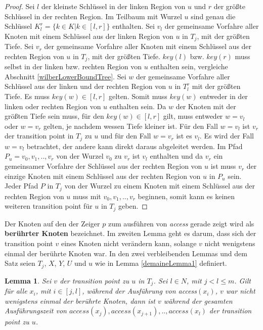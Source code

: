 \documentclass[a4paper,12pt]{article}
\newtheorem{Lemma}{Lemma}[section]
\begin{document}
\begin{proof}
	Sei $l$ der kleinste Schlüssel in der linken Region von $u$ und $r$ der größte Schlüssel in der rechten Region. Im Teilbaum mit Wurzel $u$ sind genau die Schlüssel $K^r_l = \{k \in K \vert k \in \left[l,r\right]\}$ enthalten. Sei $v_l$ der gemeinsame Vorfahre aller Knoten mit einem Schlüssel aus der linken Region von $u$ in $T_j$, mit der größten Tiefe. Sei $v_r$ der gemeinsame Vorfahre aller Knoten mit einem Schlüssel aus der rechten Region von $u$ in $T_j$, mit der größten Tiefe. $\mathit{key\left(l\right)}$ bzw. $\mathit{key\left(r\right)}$ muss selbst in der linken bzw. rechten Region von $u$ enthalten sein, vergleiche Abschnitt \ref{wilberLowerBoundTree}. Sei $w$ der gemeinsame Vorfahre aller Schlüssel aus der linken und der rechten Region von $u$ in $T^r_l$ mit der größten Tiefe. Es muss $\mathit{key}\left(w\right) \in \left[l,r\right]$ gelten. Somit muss  $\mathit{key}\left(w\right)$ entweder in der linken oder rechten Region von $u$ enthalten sein. Da $w$ der Knoten mit der größten Tiefe sein muss, für den  $\mathit{key\left(w\right)} \in \left[l,r\right]$  gilt, muss entweder $w = v_l$ oder $w = v_r$ gelten, je nachdem wessen Tiefe kleiner ist. Für den Fall $w = v_l$ ist $v_r$ der transition point in $T_j$ zu $u$ und für den Fall $w = v_r$ ist es $v_l$.
	Es wird der Fall $w = v_l$ betrachtet, der andere kann direkt daraus abgeleitet werden. Im Pfad $P_u = v_0,v_1,..,v_r$ von der Wurzel $v_0$ zu $v_r$ ist $v_l$ enthalten und da $v_r$ ein gemeinsamer Vorfahre der Schlüssel aus der rechten Region von $u$ ist muss $v_r$ der einzige Knoten mit einem Schlüssel aus der rechten Region von $u$ in $P_u$ sein. Jeder Pfad $P$ in $T_j$ von der Wurzel zu einem Knoten mit einem Schlüssel aus der rechten Region von $u$ muss mit $v_0,v_1,..,v_r$ beginnen, somit kann es keinen weiteren transition point für $u$ in $T_j$ geben. 
	
\end{proof}
\noindent Der Knoten auf den der Zeiger $p$ zum ausführen von \textit{access} gerade zeigt wird als \textbf{berührter Knoten} bezeichnet.
Im zweiten Lemma geht es darum, dass sich der transition point $v$ eines Knoten nicht verändern kann, solange $v$ nicht wenigstens einmal der berührte Knoten war. In den zwei verbleibenden Lemmas und dem Satz seien  $T_j$, $X$, $Y$, $U$ und $u$ wie in  Lemma \ref{demaineLemma1} definiert. 



\begin{Lemma} \label{demaineLemma2} \label{lemmaDemaine2}
	Sei $v$ der transition point zu $u$ in $T_j$.  Sei  $l \in \mathit{N}$, mit $j < l \leq m$. Gilt für alle $x_i$, mit $i \in \left[j,l\right]$, während der Ausführung von \textit{access}$\left(x_i\right)$,  $v$ war nicht wenigstens einmal der berührte Knoten, dann ist $v$ während der gesamten Ausführungszeit von $\textit{access}\left(x_j\right),\textit{access}\left(x_{j+1}\right),..,\textit{access}\left(x_l\right)$ der transition point zu $u$. 
\end{Lemma}
\end{document}
